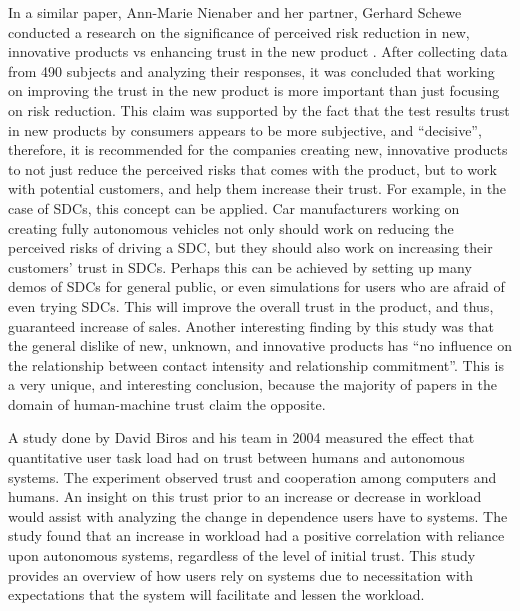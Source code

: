 \documentclass[runningheads,a4paper]{llncs}
\begin{document}
In a similar paper, Ann-Marie Nienaber and her partner, Gerhard Schewe conducted a research on the significance of perceived risk reduction in new, innovative products vs enhancing trust in the new product \cite{nienaber2014enhancing}. After collecting data from 490 subjects and analyzing their responses, it was concluded that working on improving the trust in the new product is more important than just focusing on risk reduction. This claim was supported by the fact that the test results trust in new products by consumers appears to be more subjective, and ``decisive'', therefore, it is recommended for the companies creating new, innovative products to not just reduce the perceived risks that comes with the product, but to work with potential customers, and help them increase their trust. For example, in the case of SDCs, this concept can be applied. Car manufacturers working on creating fully autonomous vehicles not only should work on reducing the perceived risks of driving a SDC, but they should also work on increasing their customers' trust in SDCs. Perhaps this can be achieved by setting up many demos of SDCs for general public, or even simulations for users who are afraid of even trying SDCs. This will improve the overall trust in the product, and thus, guaranteed increase of sales. Another interesting finding by this study was that the general dislike of new, unknown, and innovative products has ``no influence on the
relationship between contact intensity and relationship commitment''. This is a very unique, and interesting conclusion, because the majority of papers in the domain of human-machine trust claim the opposite.

A study done by David Biros and his team in 2004 measured the effect that quantitative user task load had on trust between humans and autonomous systems\cite{biros2004influence}.  The experiment observed trust and cooperation among computers and humans.  An insight on this trust prior to an increase or decrease in workload would assist with analyzing the change in dependence users have to systems.  The study found that an increase in workload had a positive correlation with reliance upon autonomous systems, regardless of the level of initial trust.  This study provides an overview of how users rely on systems due to necessitation with expectations that the system will facilitate and lessen the workload.
\end{document}
